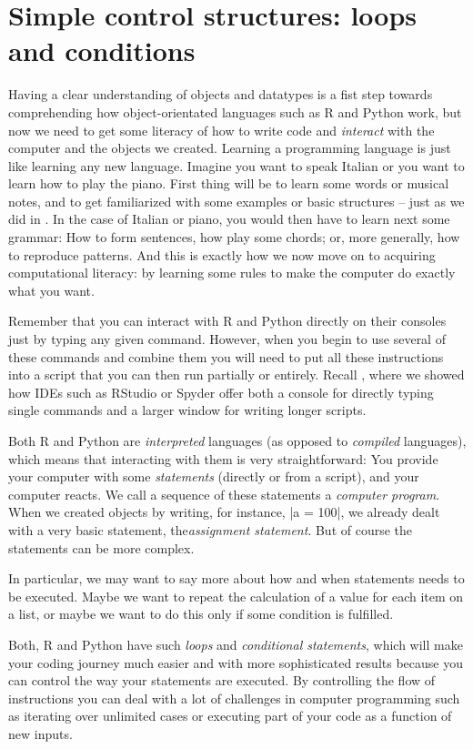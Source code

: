 \section{Simple control structures: loops and conditions}	
\label{sec:controlstructures}

Having a clear understanding of objects and datatypes is a fist step
towards comprehending how object-orientated languages such as R and Python work,
but now we need to get some literacy of how to write code and \emph{interact}
with the computer and the objects we created. Learning a programming
language is just like learning any new language.  Imagine you want to
speak Italian or you want to learn how to play the piano. First thing
will be to learn some words or musical notes, and to get familiarized
with some examples or basic structures -- just as we did in . In the
case of Italian or piano, you would then have to learn next some grammar:
How to form sentences, how play some chords; or, more generally,
how to reproduce patterns. And this is exactly how we 
now move on to acquiring computational literacy: by learning some
rules to make the computer do exactly what you want.

Remember that you can interact with R and Python directly on their
consoles just by typing any given command. However, when
you begin to use several of these commands and combine them
you will need to put all these instructions into a
script that you can then run partially or entirely. Recall ,
where we showed how IDEs such as RStudio or Spyder offer both a
console for directly typing single commands and a larger window
for writing longer scripts.

Both R and Python are \emph{interpreted} languages (as opposed to
\emph{compiled} languages), which means that interacting with
them is very straightforward: You provide your computer with some
\emph{statements} (directly or from a script), and your computer
reacts. We call a sequence of these statements a \emph{computer program}.
When we created objects by writing, for instance,
|a = 100|,  we already dealt with a very basic statement, the\emph{assignment statement}. But of course the statements can be more complex.

In particular, we may want to say more about how and when
statements needs to be executed. Maybe we want to repeat
the calculation of a value for each item on a list, or maybe
we want to do this only if some condition is fulfilled.

Both, R and Python have such \emph{loops} and \emph{conditional statements}, which will
make your coding journey much easier and with more sophisticated
results because you can control the way your statements are
executed. By controlling the flow of instructions you can deal with a
lot of challenges in computer programming such as iterating over
unlimited cases or executing part of your code as a function of new
inputs.

